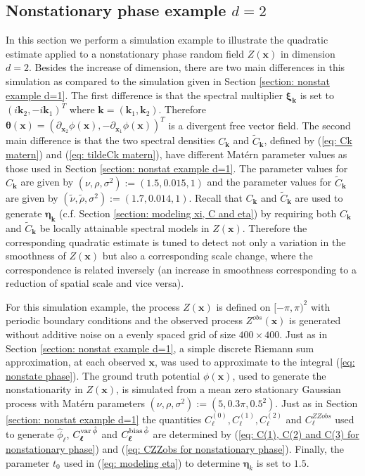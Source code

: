 \documentclass[10pt,noinfoline]{imsart}
\newcommand{\bs}{\boldsymbol}
\begin{document}
\subsection{Nonstationary phase example $d=2$}
\label{section: nonstat example d=2}


In this section we perform a simulation example to illustrate the quadratic estimate applied to a nonstationary phase random field $Z(\bs x)$ in dimension $d=2$. Besides the increase of dimension, there are two main differences in this simulation as compared to the simulation given in Section \ref{section: nonstat example d=1}. The first difference is that the spectral multiplier $\bs \xi_{\bs k}$ is set to $(i\bs k_2, -i\bs k_1)^T$ where $\bs k = (\bs k_1, \bs k_2)$. Therefore $\bs \theta(\bs x) = (\partial_{\bs x_2}\phi(\bs x), -\partial_{\bs x_1}\phi(\bs x))^T$ is a divergent free vector field. The second main difference is that the two spectral densities $C_{\bs k}$ and $\tilde C_{\bs k}$, defined by (\ref{eq: Ck matern}) and (\ref{eq: tildeCk matern}), have different Mat\'ern parameter values as those used in Section \ref{section: nonstat example d=1}. The parameter values for $C_{\bs k}$  are given by $(\nu, \rho, \sigma^2):=(1.5, 0.015, 1)$ and the parameter values for $\tilde C_{\bs k}$ are given by $(\tilde \nu, \tilde\rho, \sigma^2):=(1.7, 0.014, 1)$. Recall that $C_{\bs k}$ and $\tilde C_{\bs k}$ are used to generate $\bs \eta_{\bs k}$ (c.f. Section \ref{section: modeling xi, C and eta}) by requiring both $C_{\bs k}$ and $\tilde C_{\bs k}$ be locally attainable spectral models in $Z(\bs x)$. Therefore the corresponding quadratic estimate is tuned to detect not only a variation in the smoothness of $Z(\bs x)$ but also a corresponding scale change, where the correspondence is related inversely (an increase in smoothness corresponding to a reduction of spatial scale and vice versa).

For this simulation example, the process $Z(\bs x)$  is defined on $[-\pi,\pi)^2$ with periodic boundary conditions and the observed process $Z^{obs}(\bs x)$ is generated without additive noise on a evenly spaced grid of size $400 \times 400$. Just as in Section \ref{section: nonstat example d=1}, a simple discrete Riemann sum approximation, at each observed $\bs x$, was used to approximate to the integral (\ref{eq: nonstate phase}). 
The ground truth potential $\phi(\bs x)$, used to generate the nonstationarity in $Z(\bs x)$, is simulated from a mean zero stationary Gaussian process with Mat\'ern parameters $(\nu, \rho, \sigma^2):=(5, 0.3 \pi, 0.5^2)$. Just as in Section \ref{section: nonstat example d=1} the quantities $C^{(0)}_{\bs \ell}, C^{(1)}_{\bs \ell}, C^{(2)}_{\bs \ell}$ and $C^{ZZobs}_{\bs \ell}$ used to generate  $\hat\phi_{\bs\ell}$, $C^{\text{var\,}\hat\phi}_{\bs\ell}$ and $C^{\text{bias\,}\hat\phi}_{\bs \ell}$ are determined by (\ref{eq: C(1), C(2) and C(3) for nonstationary phase}) and (\ref{eq: CZZobs for nonstationary phase}). Finally, the parameter $t_0$ used in (\ref{eq: modeling eta}) to determine $\bs \eta_k$ is set to $1.5$.
\end{document}
